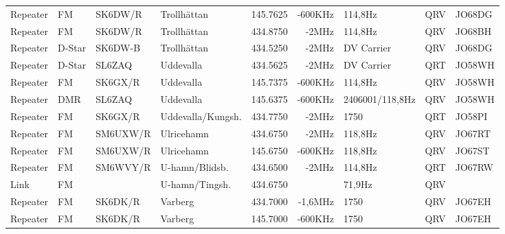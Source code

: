 \begin{landscape}
\begin{longtable}{llllrrlcl}
	Repeater                  & FM            & SK6DW/R       & Trollhättan         & 145.7625          & -600KHz        & 114,8Hz          & QRV             & JO68DG           \\
	Repeater                  & FM            & SK6DW/R       & Trollhättan         & 434.8750          & -2MHz          & 114,8Hz          & QRV             & JO68BH           \\
	Repeater                  & D-Star        & SK6DW-B       & Trollhättan         & 434.5250          & -2MHz          & DV Carrier       & QRV             & JO68DG           \\
	Repeater                  & D-Star        & SL6ZAQ        & Uddevalla           & 434.5625          & -2MHz          & DV Carrier       & QRT             & JO58WH           \\
	Repeater                  & FM            & SK6GX/R       & Uddevalla           & 145.7375          & -600KHz        & 114,8Hz          & QRV             & JO58WH           \\
	Repeater                  & DMR           & SL6ZAQ        & Uddevalla           & 145.6375          & -600KHz        & 2406001/118,8Hz  & QRV             & JO58WH           \\
	Repeater                  & FM            & SK6GX/R       & Uddevalla/Kungsh.   & 434.7750          & -2MHz          & 1750             & QRT             & JO58PI           \\
	Repeater                  & FM            & SM6UXW/R      & Ulricehamn          & 434.6750          & -2MHz          & 118,8Hz          & QRV             & JO67RT           \\
	Repeater                  & FM            & SM6UXW/R      & Ulricehamn          & 145.6750          & -600KHz        & 118,8Hz          & QRV             & JO67ST           \\
	Repeater                  & FM            & SM6WVY/R      & U-hamn/Blidsb.      & 434.6500          & -2MHz          & 114,8Hz          & QRT             & JO67RW           \\
	Link                      & FM            &               & U-hamn/Tingsh.      & 434.6750          &                & 71,9Hz           & QRV             & \\
	Repeater                  & FM            & SK6DK/R       & Varberg             & 434.7000          & -1,6MHz        & 1750             & QRV             & JO67EH           \\
	Repeater                  & FM            & SK6DK/R       & Varberg             & 145.7000          & -600KHz        & 1750             & QRV             & JO67EH           \\

\end{longtable}
\end{landscape}
